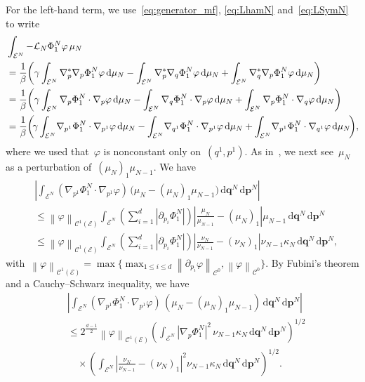 \documentclass[onefignum,onetabnum]{siamart251216} %
\renewcommand{\d}{\mathrm{d}}
\newcommand{\norm}[1]{\left\lVert#1\right\rVert}
\newcommand{\mc}[1]{\mathcal{#1}}
\renewcommand{\leq}{\leqslant}
\newcommand{\mescin}{\mu}
\newcommand{\mespos}{\nu}
\newcommand{\mesvit}{\kappa}
\newcommand{\vq}[1]{q^{#1}}
\newcommand{\vp}[1]{p^{#1}}
\newcommand{\vP}[1]{\mathbf{p}^{#1}}
\newcommand{\vQ}[1]{\mathbf{q}^{#1}}
\theoremstyle{plain}
\numberwithin{equation}{section}
\numberwithin{theorem}{section}
\begin{document}
For the left-hand term,
we use~\eqref{eq:generator_mf}, \eqref{eq:LhamN} and~\eqref{eq:LSymN} to write
\begin{align}
    \notag
    &\int_{\mc{E}^{N}}-\mathcal{L}_N \Phi_1^N  \varphi \, \mescin_N \\
    \notag
    & = \frac1\beta\!\left(\gamma\int_{\mc{E}^{N}}\nabla_p^*\nabla_p\Phi_1^N \varphi \, \d\mescin_N
    - \int_{\mc{E}^{N}}\nabla_p^*\nabla_q \Phi_1^N  \varphi \, \d\mescin_N
    + \int_{\mc{E}^{N}}\nabla_q^*\nabla_p\Phi_1^N  \varphi \, \d\mescin_N \right) \\
    \notag
    & = \frac1\beta\!\left(\gamma\int_{\mc{E}^{N}}\nabla_p\Phi_1^N \cdot \nabla_p\varphi \, \d\mescin_N
    - \int_{\mc{E}^{N}}\nabla_q \Phi_1^N \cdot \nabla_p\varphi \, \d\mescin_N
    + \int_{\mc{E}^{N}}\nabla_p\Phi_1^N \cdot \nabla_q\varphi \, \d\mescin_N \right) \\
    \label{eq:rewriting_fc_test}
    &= \frac1\beta\!
    \left(\!\gamma\int_{\mc{E}^{N}}\!\nabla_{\vp{1}}\Phi_1^N \cdot\nabla_{\vp{1}}\varphi \, \d\mescin_N
    - \int_{\mc{E}^{N}}\!\nabla_{\vq{1}} \Phi_1^N \cdot \nabla_{\vp{1}}\varphi \,\d \mescin_N  + \int_{\mc{E}^{N}}\!\nabla_{\vp{1}}\Phi_1^N \cdot\nabla_{\vq{1}}\varphi \, \d\mescin_N\!\right)\!,
\end{align}
where we used that~$\varphi$ is nonconstant only on~$(\vq{1},\vp{1})$.
As in~\cite{delgadino2021diffusive},
we next see~$\mescin_N$ as a perturbation of~$(\mescin_N)_1\mescin_{N-1}$.
We have
\begin{align*}
    &\left|\int_{\mc{E}^{N}}(\nabla_{\vp{1}}\Phi_1^N \cdot \nabla_{\vp{1}}\varphi )\,
     \bigl(\mescin_N - (\mescin_N)_1\mescin_{N-1}\bigr)\,\d \vQ{N}\,\d \vP{N}\right| \\
    &\leq \norm{\varphi}_{\mc{C}^1(\mc{E})}
    \int_{\mc{E}^{N}}\!\left(\sum_{i=1}^{d}|\partial_{p_i}\Phi_1^N|\right)
    \left|\frac{\mescin_N}{\mescin_{N-1}} - (\mescin_N)_1\right|\mescin_{N-1}\,\d \vQ{N}\,\d \vP{N} \\
    &\leq \norm{\varphi}_{\mc{C}^1(\mc{E})}
    \int_{\mc{E}^{N}}\!\left(\sum_{i=1}^{d}|\partial_{p_i}\Phi_1^N|\right)
    \left|\frac{\mespos_N}{\mespos_{N-1}} - (\mespos_N)_1\right|\mespos_{N-1}\mesvit_N\,\d \vQ{N}\,\d \vP{N},
 \end{align*}
 with~$\norm{\varphi}_{\mc{C}^1(\mc{E})} =\max\{\max_{1\leq i\leq d}\norm{\partial_{p_i}\varphi}_{\mc{C}^0},\norm{\varphi}_{\mc{C}^0}\}$.
  By Fubini's theorem and a Cauchy--Schwarz inequality, we have
 \begin{align*}
    &\left|\int_{\mc{E}^{N}}(\nabla_{\vp{1}}\Phi_1^N \cdot \nabla_{\vp{1}}\varphi )\,
     ( \mescin_N - (\mescin_N)_1\mescin_{N-1})\,\d \vQ{N}\,\d \vP{N}\right| \\
     &\leq 2^{\frac{d-1}{2}}\norm{\varphi}_{\mc{C}^1(\mc{E})}
     \left(\int_{\mc{E}^N}|\nabla_p \Phi_1^N|^2 \,\mespos_{N-1}\mesvit_N\,\d \vQ{N}\,\d \vP{N}\right)^{1/2} \\
     & \quad \times \left(\int_{\mc{E}^N}\left|\frac{\mespos_N}{\mespos_{N-1}} - (\mespos_N)_1\right|^2\mespos_{N-1}\mesvit_N\,\d \vQ{N}\,\d \vP{N}\right)^{1/2}\!.
 \end{align*}
\end{document}
